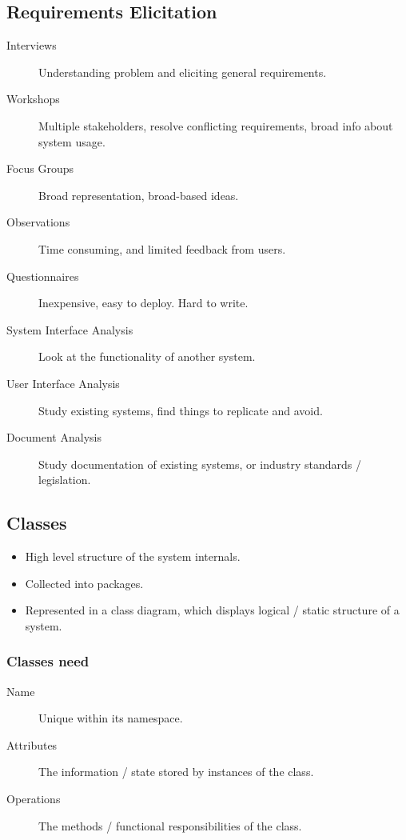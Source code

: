 \documentclass[landscape]{cheat}
\begin{document}
\begin{multicols}{3}
\subsection{Requirements Elicitation}
\begin{description}
    \item[Interviews] Understanding problem and eliciting general requirements.
    \item[Workshops] Multiple stakeholders, resolve conflicting requirements, broad info about system usage.
    \item[Focus Groups] Broad representation, broad-based ideas.
    \item[Observations] Time consuming, and limited feedback from users.
    \item[Questionnaires] Inexpensive, easy to deploy. Hard to write.
    \item[System Interface Analysis] Look at the functionality of another system.
    \item[User Interface Analysis] Study existing systems, find things to replicate and avoid.
    \item[Document Analysis] Study documentation of existing systems, or industry standards / legislation.
\end{description}

\subsection{Classes}
\begin{itemize}
    \item High level structure of the system internals.
    \item Collected into packages.
    \item Represented in a class diagram, which displays logical / static structure of a system.
\end{itemize}

\subsubsection{Classes need}
\begin{description}
    \item[Name] Unique within its namespace.
    \item[Attributes] The information / state stored by instances of the class.
    \item[Operations] The methods / functional responsibilities of the class.
\end{description}


\end{multicols}
\end{document}
